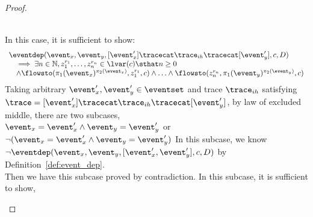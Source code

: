 \begin{proof}
\begin{case}
        \\
        In this case, it is sufficient to show:
        \[    \begin{array}{l}
          \eventdep(\event_x, \event_y, [\event_x'] \tracecat \trace_{ih} \tracecat [\event_y'], c, D) 
          \\ \quad 
          \implies 
          \exists n \in \mathbb{N}, z_1^{r_1}, \ldots, z_n^{r_n} \in \lvar(c) \sthat  n \geq 0 
          \\ \quad  
          \land
          \flowsto(\pi_1(\event_x)^{\pi_2(\event_x)},  z_1^{r_1}, c) 
          \land \ldots \land \flowsto(z_n^{r_n}, \pi_1(\event_y)^{\pi_2(\event_y)}, c) 
        \end{array}
        \]
        Taking arbitrary $ \event_x', \event_y' \in \eventset $ and trace $\trace_{ih} $
          satisfying $\trace = [\event_x'] \tracecat \trace_{ih} \tracecat [\event_y']$, 
        by law of excluded middle, there are two subcases,
        \\
        $\event_x = \event_x' \land  \event_y = \event_y'$ or
        $\neg(\event_x = \event_x' \land  \event_y = \event_y')$
        In this subcase,
        we know $\neg \eventdep(\event_x, \event_y, [\event_x', \event_y'], c, D)$
        by Definition~\ref{def:event_dep}.
        \\
        Then we have this subcase proved by contradiction.
        In this subcase,  it is sufficient to show,

\end{case}
\end{proof}
